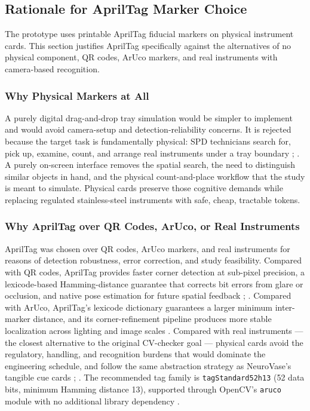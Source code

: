 \documentclass[10pt,a4paper]{article}
\begin{document}
\subsection{Rationale for AprilTag Marker Choice}

The prototype uses printable AprilTag fiducial markers on physical instrument
cards. This section justifies AprilTag specifically against the alternatives of
no physical component, QR codes, ArUco markers, and real instruments with
camera-based recognition.
\subsubsection{Why Physical Markers at All}

A purely digital drag-and-drop tray simulation would be simpler to implement
and would avoid camera-setup and detection-reliability concerns. It is rejected
because the target task is fundamentally physical: SPD technicians search for,
pick up, examine, count, and arrange real instruments under a tray boundary
\cite{nichol-et-al-2024};
\cite{alfred-et-al-2021}. A purely on-screen
interface removes the spatial search, the need to distinguish similar objects
in hand, and the physical count-and-place workflow that the study is meant to
simulate. Physical cards preserve those cognitive demands while replacing
regulated stainless-steel instruments with safe, cheap, tractable tokens.
\subsubsection{Why AprilTag over QR Codes, ArUco, or Real Instruments}

AprilTag was chosen over QR codes, ArUco markers, and real instruments for
reasons of detection robustness, error correction, and study feasibility.
Compared with QR codes, AprilTag provides faster corner detection at sub-pixel
precision, a lexicode-based Hamming-distance guarantee that corrects bit errors
from glare or occlusion, and native pose estimation for future spatial feedback
\cite{olson-2011};
\cite{kalaitzakis-et-al-2021}.
Compared with ArUco, AprilTag's lexicode dictionary guarantees a larger minimum
inter-marker distance, and its corner-refinement pipeline produces more stable
localization across lighting and image scales
\cite{wang-et-al-2016-apriltag}. Compared with
real instruments --- the closest alternative to the original CV-checker goal ---
physical cards avoid the regulatory, handling, and recognition burdens that
would dominate the engineering schedule, and follow the same abstraction
strategy as NeuroVase's tangible cue cards
\cite{jahani-et-al-2026-neurovase};
\cite{kienle-et-al-2025}. The recommended tag
family is \texttt{tagStandard52h13} (52 data bits, minimum Hamming distance 13),
supported through OpenCV's \texttt{aruco} module with no additional library dependency
\cite{krogius-et-al-2019}.
\end{document}
